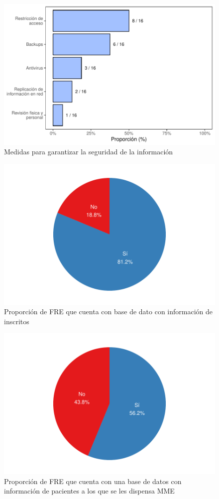 \documentclass[
]{book}
\begin{document}
\begin{figure}
\includegraphics[width=0.85\linewidth]{InformeFinal_files/figure-latex/GarantiaInformacion-1} \caption{Medidas para garantizar la seguridad de la información}\label{fig:GarantiaInformacion}
\end{figure}
\begin{figure}
\includegraphics[width=0.85\linewidth]{InformeFinal_files/figure-latex/InformInscritos-1} \caption{Proporción de FRE que cuenta con base de dato con información de inscritos}\label{fig:InformInscritos}
\end{figure}
\begin{figure}
\includegraphics[width=0.85\linewidth]{InformeFinal_files/figure-latex/InformPacientes-1} \caption{Proporción de FRE que cuenta con una base de datos con información de pacientes a los que se les dispensa MME}\label{fig:InformPacientes}
\end{figure}
\end{document}

